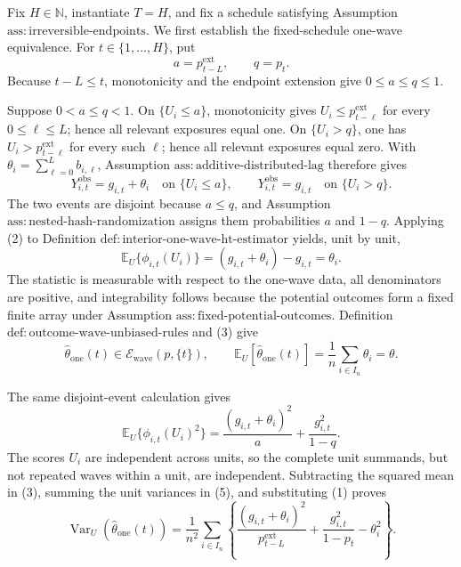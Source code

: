 Fix \(H\in\mathbb N\), instantiate \(T=H\), and fix a schedule satisfying Assumption \(\mathrm{ass:irreversible\text{-}endpoints}\).  We first establish the fixed-schedule one-wave equivalence.  For \(t\in\{1,\ldots,H\}\), put
\[
 a=p^{\mathrm{ext}}_{t-L},\qquad q=p_t.
\tag{1}
\]
Because \(t-L\leq t\), monotonicity and the endpoint extension give \(0\leq a\leq q\leq1\).

Suppose \(0<a\leq q<1\).  On \(\{U_i\leq a\}\), monotonicity gives \(U_i\leq p^{\mathrm{ext}}_{t-\ell}\) for every \(0\leq\ell\leq L\); hence all relevant exposures equal one.  On \(\{U_i>q\}\), one has \(U_i>p^{\mathrm{ext}}_{t-\ell}\) for every such \(\ell\); hence all relevant exposures equal zero.  With \(\theta_i=\sum_{\ell=0}^{L}b_{i,\ell}\), Assumption \(\mathrm{ass:additive\text{-}distributed\text{-}lag}\) therefore gives
\[
 Y^{\mathrm{obs}}_{i,t}=g_{i,t}+\theta_i
 \quad\text{on }\{U_i\leq a\},
 \qquad
 Y^{\mathrm{obs}}_{i,t}=g_{i,t}
 \quad\text{on }\{U_i>q\}.
\tag{2}
\]
The two events are disjoint because \(a\leq q\), and Assumption \(\mathrm{ass:nested\text{-}hash\text{-}randomization}\) assigns them probabilities \(a\) and \(1-q\).  Applying (2) to Definition \(\mathrm{def:interior\text{-}one\text{-}wave\text{-}ht\text{-}estimator}\) yields, unit by unit,
\[
 \mathbb E_U\{\phi_{i,t}(U_i)\}
 =(g_{i,t}+\theta_i)-g_{i,t}=\theta_i.
\tag{3}
\]
The statistic is measurable with respect to the one-wave data, all denominators are positive, and integrability follows because the potential outcomes form a fixed finite array under Assumption \(\mathrm{ass:fixed\text{-}potential\text{-}outcomes}\).  Definition \(\mathrm{def:outcome\text{-}wave\text{-}unbiased\text{-}rules}\) and (3) give
\[
 \widehat\theta_{\mathrm{one}}(t)\in
 \mathcal E_{\mathrm{wave}}(p,\{t\}),
 \qquad
 \mathbb E_U\!\left[\widehat\theta_{\mathrm{one}}(t)\right]
 =\frac1n\sum_{i\in I_n}\theta_i=\theta.
\tag{4}
\]

The same disjoint-event calculation gives
\[
 \mathbb E_U\{\phi_{i,t}(U_i)^2\}
 =\frac{(g_{i,t}+\theta_i)^2}{a}
  +\frac{g_{i,t}^2}{1-q}.
\tag{5}
\]
The scores \(U_i\) are independent across units, so the complete unit summands, but not repeated waves within a unit, are independent.  Subtracting the squared mean in (3), summing the unit variances in (5), and substituting (1) proves
\[
 \operatorname{Var}_U\!\left(\widehat\theta_{\mathrm{one}}(t)\right)
 =\frac1{n^2}\sum_{i\in I_n}
 \left\{
 \frac{(g_{i,t}+\theta_i)^2}{p^{\mathrm{ext}}_{t-L}}
 +\frac{g_{i,t}^2}{1-p_t}-\theta_i^2
 \right\}.
\tag{6}
\]

